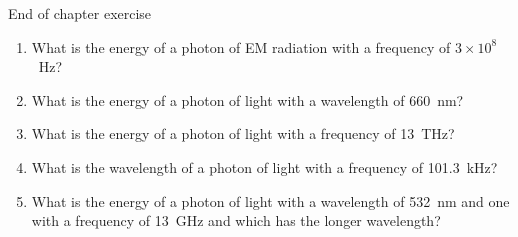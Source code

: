             \begin{eocexercises}{End of chapter exercise}\noindent\vspace{-1cm}
            \label{m38779*id189872}\begin{enumerate}[noitemsep, label=\textbf{\arabic*}. ] 
            \label{m38779*uid34}\item What is the energy of a photon of EM radiation with a frequency of $3\ensuremath{\times}{10}^{8}$~Hz?\newline
\label{m38779*uid35}\item What is the energy of a photon of light with a wavelength of 660~nm?\newline

\item What is the energy of a photon of light with a frequency of 13~THz?\newline

\item What is the wavelength of a photon of light with a frequency of 101.3~kHz?\newline

\item What is the energy of a photon of light with a wavelength of 532~nm and one with a frequency of 13~GHz and which has the longer wavelength?\newline



\end{enumerate}
\end{eocexercises}
